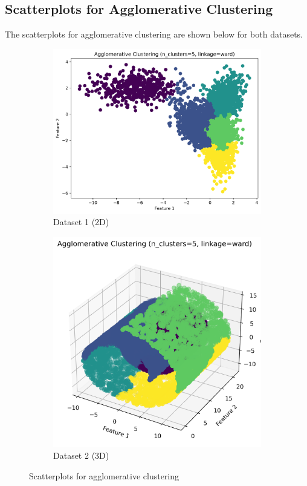 \documentclass{article}
\begin{document}
\subsection{Scatterplots for Agglomerative Clustering}
The scatterplots for agglomerative clustering are shown below for both datasets.

\begin{figure}[h]
    \centering
    \begin{subfigure}[b]{0.45\textwidth}
        \includegraphics[width=\textwidth]{figures/agglomerative_scatter_d0.png}
        \caption{Dataset 1 (2D)}
        \label{fig:agglo_2d}
    \end{subfigure}
    \begin{subfigure}[b]{0.45\textwidth}
        \includegraphics[width=\textwidth]{figures/agglomerative_scatter_d1.png}
        \caption{Dataset 2 (3D)}
        \label{fig:agglo_3d}
    \end{subfigure}
    \caption{Scatterplots for agglomerative clustering}
    \label{fig:agglo_scatterplots}
\end{figure}
\end{document}
